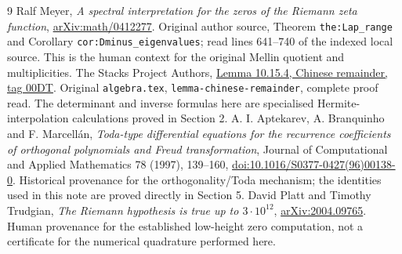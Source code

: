 \documentclass[11pt]{article}
\begin{document}
\begin{thebibliography}{9}
 Ralf Meyer, \emph{A spectral interpretation for the zeros
of the Riemann zeta function},
\href{https://arxiv.org/abs/math/0412277}{arXiv:math/0412277}.
Original author source, Theorem \texttt{the:Lap\_range} and
Corollary \texttt{cor:Dminus\_eigenvalues}; read lines 641--740
of the indexed local source. This is the human context for the
original Mellin quotient and multiplicities.
 The Stacks Project Authors,
\href{https://stacks.math.columbia.edu/tag/00DT}{Lemma 10.15.4,
Chinese remainder, tag 00DT}. Original \texttt{algebra.tex},
\texttt{lemma-chinese-remainder}, complete proof read.
The determinant and inverse formulas here are specialised
Hermite-interpolation calculations proved in Section 2.
 A. I. Aptekarev, A. Branquinho and F. Marcell\'an,
\emph{Toda-type differential equations
for the recurrence coefficients of orthogonal polynomials and Freud
transformation}, Journal of Computational and Applied Mathematics
 78 (1997), 139--160, \href{https://doi.org/10.1016/S0377-0427(96)00138-0}
 {doi:10.1016/S0377-0427(96)00138-0}.
Historical provenance for the orthogonality/Toda mechanism; the
identities used in this note are proved directly in Section 5.
 David Platt and Timothy Trudgian,
\emph{The Riemann hypothesis is true up to $3\cdot10^{12}$},
\href{https://arxiv.org/abs/2004.09765}{arXiv:2004.09765}.
Human provenance for the established low-height zero computation,
not a certificate for the numerical quadrature performed here.
\end{thebibliography}
\end{document}
